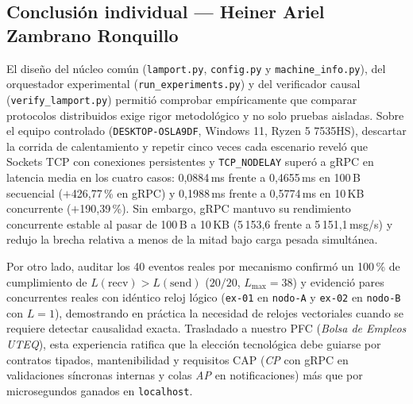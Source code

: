 \subsection*{Conclusión individual --- Heiner Ariel Zambrano Ronquillo}

El diseño del núcleo común (\texttt{lamport.py}, \texttt{config.py} y \texttt{machine\_info.py}), del orquestador experimental (\texttt{run\_experiments.py}) y del verificador causal (\texttt{verify\_lamport.py}) permitió comprobar empíricamente que comparar protocolos distribuidos exige rigor metodológico y no solo pruebas aisladas. Sobre el equipo controlado (\texttt{DESKTOP-OSLA9DF}, Windows 11, Ryzen 5 7535HS), descartar la corrida de calentamiento y repetir cinco veces cada escenario reveló que Sockets TCP con conexiones persistentes y \texttt{TCP\_NODELAY} superó a gRPC en latencia media en los cuatro casos: 0,0884\,ms frente a 0,4655\,ms en 100\,B secuencial ($+$426,77\,\% en gRPC) y 0,1988\,ms frente a 0,5774\,ms en 10\,KB concurrente ($+$190,39\,\%). Sin embargo, gRPC mantuvo su rendimiento concurrente estable al pasar de 100\,B a 10\,KB (5\,153,6 frente a 5\,151,1\,msg/s) y redujo la brecha relativa a menos de la mitad bajo carga pesada simultánea.

Por otro lado, auditar los 40 eventos reales por mecanismo confirmó un 100\,\% de cumplimiento de $L(\mathrm{recv}) > L(\mathrm{send})$ ($20/20$, $L_{\mathrm{max}}=38$) y evidenció pares concurrentes reales con idéntico reloj lógico (\texttt{ex-01} en \texttt{nodo-A} y \texttt{ex-02} en \texttt{nodo-B} con $L=1$), demostrando en práctica la necesidad de relojes vectoriales cuando se requiere detectar causalidad exacta. Trasladado a nuestro PFC (\emph{Bolsa de Empleos UTEQ}), esta experiencia ratifica que la elección tecnológica debe guiarse por contratos tipados, mantenibilidad y requisitos CAP (\emph{CP} con gRPC en validaciones síncronas internas y colas \emph{AP} en notificaciones) más que por microsegundos ganados en \texttt{localhost}.
